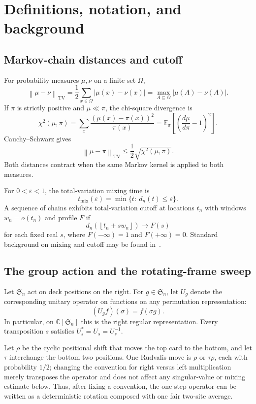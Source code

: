 \documentclass[11pt]{article}
\theoremstyle{remark}
\newcommand{\E}{\mathbb E}
\newcommand{\C}{\mathbb C}
\newcommand{\Sn}{\mathfrak S_n}
\newcommand{\TV}{\operatorname{TV}}
\newcommand{\norm}[1]{\left\lVert #1\right\rVert}
\newcommand{\floor}[1]{\left\lfloor #1\right\rfloor}
\begin{document}
\section{Definitions, notation, and background}\label{sec:prelim}

\subsection{Markov-chain distances and cutoff}
For probability measures $\mu,\nu$ on a finite set $\Omega$,
\[
 \norm{\mu-\nu}_{\TV}
 =\frac12\sum_{x\in\Omega}|\mu(x)-\nu(x)|
 =\max_{A\subseteq\Omega}|\mu(A)-\nu(A)|.
\]
If $\pi$ is strictly positive and $\mu\ll\pi$, the chi-square divergence is
\[
 \chi^2(\mu,\pi)=\sum_x\frac{(\mu(x)-\pi(x))^2}{\pi(x)}
 =\E_\pi\!\left[\left(\frac{d\mu}{d\pi}-1\right)^2\right].
\]
Cauchy--Schwarz gives
\[
 \norm{\mu-\pi}_{\TV}\le \frac12\sqrt{\chi^2(\mu,\pi)}.
\]
Both distances contract when the same Markov kernel is applied to both measures.

For $0<\varepsilon<1$, the total-variation mixing time is
\[
 t_{\mathrm{mix}}(\varepsilon)
 =\min\{t:\ d_n(t)\le\varepsilon\}.
\]
A sequence of chains exhibits total-variation cutoff at locations $t_n$ with windows $w_n=o(t_n)$ and profile $F$ if
\[
 d_n(\floor{t_n+s w_n})\longrightarrow F(s)
\]
for each fixed real $s$, where $F(-\infty)=1$ and $F(+\infty)=0$.  Standard background on mixing and cutoff may be found in~\cite{LPW,Lacoin2016}.

\subsection{The group action and the rotating-frame sweep}
Let $\Sn$ act on deck positions on the right.  For $g\in\Sn$, let $U_g$ denote the corresponding unitary operator on functions on any permutation representation:
\[
 (U_gf)(\sigma)=f(\sigma g).
\]
In particular, on $\C[\Sn]$ this is the right regular representation.  Every transposition $s$ satisfies $U_s^*=U_s=U_s^{-1}$.

Let $\rho$ be the cyclic positional shift that moves the top card to the bottom, and let $\tau$ interchange the bottom two positions.  One Rudvalis move is $\rho$ or $\tau\rho$, each with probability $1/2$; changing the convention for right versus left multiplication merely transposes the operator and does not affect any singular-value or mixing estimate below.  Thus, after fixing a convention, the one-step operator can be written as a deterministic rotation composed with one fair two-site average.
\end{document}
